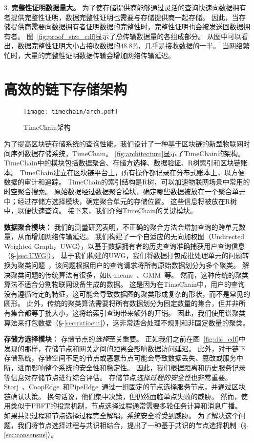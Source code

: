 3. \textbf{完整性证明数据量大。}
为了使存储提供商能够通过灵活的查询快速向数据拥有者提供完整性证明，数据完整性证明也需要与存储提供商一起存储。
因此，当存储提供商需要向数据拥有者证明数据的完整性时，完整性证明也会被发送回数据拥有者。
图~\autoref{fig:proof_size_cdf}显示了总传输数据量的各组成部分。
从图中可以看出，数据完整性证明大小占接收数据的48.8\%，几乎是接收数据的一半。
当网络繁忙时，大量的完整性证明数据传输会增加网络传输延迟。

\section{高效的链下存储架构}
\label{sec:design}

\begin{figure}[t]
    \centering
    \texttt{[image: timechain/arch.pdf]}
    \caption{TimeChain架构}
    \label{fig:architecture}
\end{figure}

为了提高区块链存储系统的查询性能，我们设计了一种基于区块链的新型物联网时间序列数据存储系统，TimeChain。
\autoref{fig:architecture}显示了TimeChain的架构。
TimeChain中的模块包括数据聚合、存储方选择、数据验证、R树索引和区块链账本。
TimeChain建立在区块链平台上，所有操作都记录在分布式账本上，以方便数据的审计和追踪。
TimeChain的索引结构是R树，可以加速物联网场景中常用的时空聚合搜索。
原始数据经过数据聚合模块，确定哪些数据被放在一个聚合单元中；经过存储方选择模块，确定聚合单元的存储位置。
这些信息将被放在R树中，以便快速查询。
接下来，我们介绍TimeChain的关键模块。

\textbf{数据聚合模块：}
我们的测量研究表明，不正确的聚合方法会增加查询的跨单元数量，从而增加网络传输延迟。
我们构建了一个自适应的无向加权图（Undirected Weighted Graph，UWG），以基于数据拥有者的历史查询准确捕获用户查询信息（§-\ref{sec:UWG}）。
基于我们构建的UWG，我们将数据打包成批处理单元的问题转换为聚类问题~\cite{xu2005survey}，该问题根据用户的查询请求将所有原始数据划分为多个聚类。
解决聚类问题的传统算法有很多，如K-means~\cite{kanungo2002efficient}、GMM~\cite{he2010laplacian}等。
然而，这种传统的聚类算法不适合分割物联网设备生成的数据。
这是因为在TimeChain中，用户的查询没有遵循特定的特征，这可能会导致数据图的聚类形成复杂的形状，而不是常见的圆形。
此外，传统的聚类算法需要将所有数据划分为固定数量的集合，但并非所有集合都等于批大小，这将给索引查询带来额外的开销。
因此，我们使用谱聚类算法来打包数据（§-\ref{sec:ratiocut}），这非常适合处理不规则和非固定数量的聚类。

\textbf{存储方选择模块：}
存储节点的\textit{选择}至关重要。
正如我们之前在图~\autoref{fig:dis_cdf}中发现的那样，存储节点和网关之间的距离会影响数据访问延迟。
此外，对于链下存储系统，存储空间不足的节点或恶意节点可能会导致数据丢失、篡改或服务中断，进而影响整个系统的安全性和稳定性。
因此，我们根据距离和历史服务记录等信息对存储节点进行综合评估。
存储节点\textit{选择过程的安全性}也非常重要。
Storj~\cite{storj2018storj}、CoopEdge~\cite{yuan2021coopedge}和PipeEdge~\cite{yuan2023pipeedge}通过一组固定的节点选择服务节点，并通过区块链确认决策。
换句话说，他们集中决策，但仍然面临单点失败的威胁。
然而，使用类似于PBFT的投票机制，节点选择过程通常需要多轮任务计算和消息广播。
如果共识过程和节点选择过程完全解耦，系统安全将受到威胁。
为了解决这个问题，我们将节点选择过程与共识相结合，提出了一种基于共识的节点选择机制（§-\ref{sec:consensus}）。

